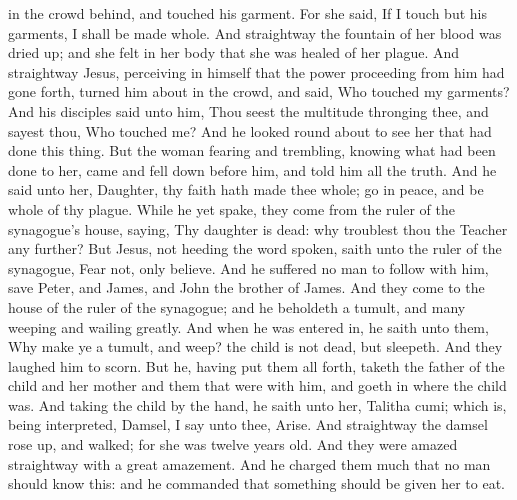 in the crowd behind, and touched his garment. For she said, If I touch but his garments, I shall be made whole. And straightway the fountain of her blood was dried up; and she felt in her body that she was healed of her plague. And straightway Jesus, perceiving in himself that the power proceeding from him had gone forth, turned him about in the crowd, and said, Who touched my garments? And his disciples said unto him, Thou seest the multitude thronging thee, and sayest thou, Who touched me? And he looked round about to see her that had done this thing. But the woman fearing and trembling, knowing what had been done to her, came and fell down before him, and told him all the truth. And he said unto her, Daughter, thy faith hath made thee whole; go in peace, and be whole of thy plague.  While he yet spake, they come from the ruler of the synagogue’s house, saying, Thy daughter is dead: why troublest thou the Teacher any further? But Jesus, not heeding the word spoken, saith unto the ruler of the synagogue, Fear not, only believe. And he suffered no man to follow with him, save Peter, and James, and John the brother of James. And they come to the house of the ruler of the synagogue; and he beholdeth a tumult, and many weeping and wailing greatly. And when he was entered in, he saith unto them, Why make ye a tumult, and weep? the child is not dead, but sleepeth. And they laughed him to scorn. But he, having put them all forth, taketh the father of the child and her mother and them that were with him, and goeth in where the child was. And taking the child by the hand, he saith unto her, Talitha cumi; which is, being interpreted, Damsel, I say unto thee, Arise. And straightway the damsel rose up, and walked; for she was twelve years old. And they were amazed straightway with a great amazement. And he charged them much that no man should know this: and he commanded that something should be given her to eat. 

